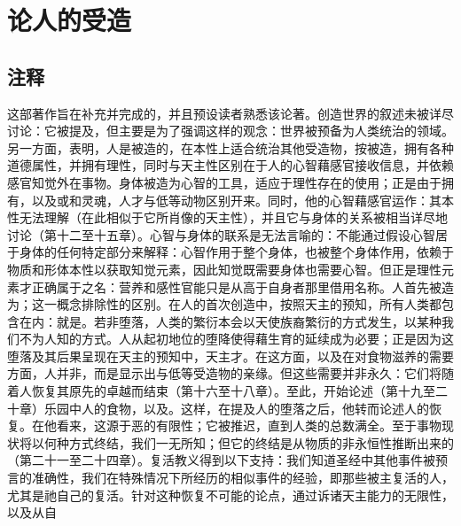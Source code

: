 
\chapter{论人的受造}



\section{注释}

这部著作旨在补充并完成的，并且预设读者熟悉该论著。创造世界的叙述未被详尽讨论：它被提及，但主要是为了强调这样的观念：世界被预备为人类统治的领域。另一方面，表明，人是被造的，在本性上适合统治其他受造物，按被造，拥有各种道德属性，并拥有理性，同时与天主性区别在于人的心智藉感官接收信息，并依赖感官知觉外在事物。身体被造为心智的工具，适应于理性存在的使用；正是由于拥有，以及或和灵魂，人才与低等动物区别开来。同时，他的心智藉感官运作：其本性无法理解（在此相似于它所肖像的天主性），并且它与身体的关系被相当详尽地讨论（第十二至十五章）。心智与身体的联系是无法言喻的：不能通过假设心智居于身体的任何特定部分来解释：心智作用于整个身体，也被整个身体作用，依赖于物质和形体本性以获取知觉元素，因此知觉既需要身体也需要心智。但正是理性元素才正确属于之名：营养和感性官能只是从高于自身者那里借用名称。人首先被造为；这一概念排除性的区别。在人的首次创造中，按照天主的预知，所有人类都包含在内：就是。若非堕落，人类的繁衍本会以天使族裔繁衍的方式发生，以某种我们不为人知的方式。人从起初地位的堕降使得藉生育的延续成为必要；正是因为这堕落及其后果呈现在天主的预知中，天主才。在这方面，以及在对食物滋养的需要方面，人并非，而是显示出与低等受造物的亲缘。但这些需要并非永久：它们将随着人恢复其原先的卓越而结束（第十六至十八章）。至此，开始论述（第十九至二十章）乐园中人的食物，以及。这样，在提及人的堕落之后，他转而论述人的恢复。在他看来，这源于恶的有限性；它被推迟，直到人类的总数满全。至于事物现状将以何种方式终结，我们一无所知；但它的终结是从物质的非永恒性推断出来的（第二十一至二十四章）。复活教义得到以下支持：我们知道圣经中其他事件被预言的准确性，我们在特殊情况下所经历的相似事件的经验，即那些被主复活的人，尤其是祂自己的复活。针对这种恢复不可能的论点，通过诉诸天主能力的无限性，以及从自